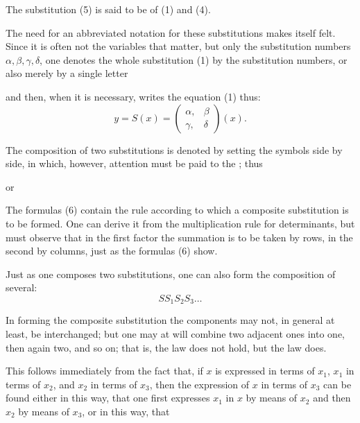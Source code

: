 
The substitution (5) is said to be  of (1) and (4).

The need for an abbreviated notation for these substitutions
makes itself felt. Since it is often not the variables that matter,
but only the substitution numbers $\alpha, \beta, \gamma, \delta$,
one denotes the whole substitution (1) by the substitution numbers,
or also merely by a single letter

and then, when it is necessary, writes the equation (1) thus:
\[
y = S(x) = \begin{pmatrix} \alpha, & \beta \\ \gamma, & \delta \end{pmatrix}(x).
\]

The composition of two substitutions is denoted by setting
the symbols side by side, in which, however, attention must be
paid to the ; thus

or

The formulas (6) contain the rule according to which a
composite substitution is to be formed. One can derive it from
the multiplication rule for determinants, but must observe that
in the first factor the summation is to be taken by rows, in the
second by columns, just as the formulas (6) show.

Just as one composes two substitutions, one can also form
the composition of several:
\[
S S_1 S_2 S_3 \ldots
\]

In forming the composite substitution the components may
not, in general at least, be interchanged; but one may at will
combine two adjacent ones into one, then again two, and so
on; that is, the  law does not hold, but the
 law does.

This follows immediately from the fact that, if $x$ is expressed
in terms of $x_1$, $x_1$ in terms of $x_2$, and $x_2$ in terms of $x_3$,
then the expression of $x$ in terms of $x_3$ can be found either in
this way, that one first expresses $x_1$ in $x$ by means of $x_2$ and
then $x_2$ by means of $x_3$, or in this way, that
